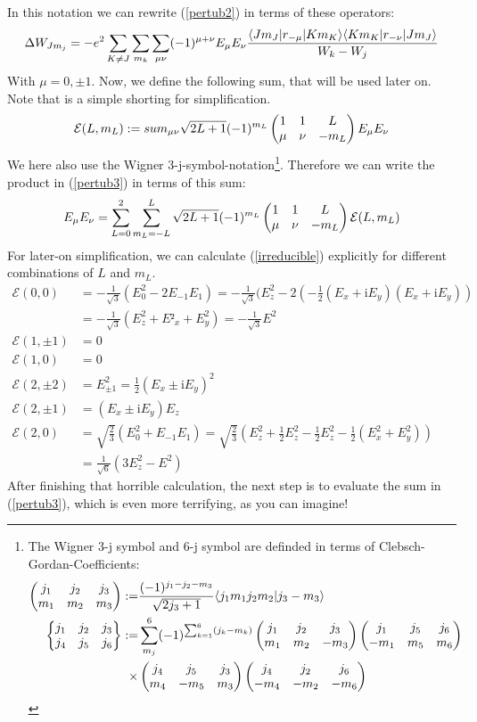 In this notation we can rewrite (\ref{pertub2}) in terms of these operators:
\begin{equation}
\Delta W_{Jm_j}=-e^2\sum_{K\neq J}\sum_{m_k}\sum_{\mu\nu}(-1)^{\mu+\nu}E_\mu E_\nu\frac{\langle Jm_J| r_{-\mu} | Km_K\rangle\langle Km_K| r_{-\nu} | Jm_J\rangle}{W_k-W_j}\label{pertub3}
\end{equation}
With $\mu=0,\pm1$. Now, we define the following sum, that will be used later on. Note that is a simple shorting for simplification.
\begin{equation}
\mathcal{E}(L,m_L):=\\sum_{\mu\nu}\sqrt{2L+1}(-1)^{m_L}\begin{pmatrix}1&1&L\\\mu&\nu&-m_L\end{pmatrix}E_\mu E_\nu\label{irreducible}
\end{equation}
We here also use the Wigner 3-j-symbol-notation\footnote{The Wigner 3-j symbol and 6-j symbol are definded in terms of Clebsch-Gordan-Coefficients:\begin{align}\begin{pmatrix}j_1&j_2&j_3\\m_1&m_2&m_3\end{pmatrix}:=&\frac{(-1)^{j_1-j_2-m_3}}{\sqrt{2j_3+1}}\langle j_1m_1j_2m_2 | j_3-m_3 \rangle\\\begin{Bmatrix}j_1&j_2&j_3\\j_4&j_5&j_6\end{Bmatrix}:=&\sum^6_{m_j}(-1)^{\sum^6_{k=1}(j_k-m_k)}\begin{pmatrix}j_1&j_2&j_3\\m_1&m_2&-m_3\end{pmatrix}\begin{pmatrix}j_1&j_5&j_6\\-m_1&m_5&m_6\end{pmatrix}\\\times&\begin{pmatrix}j_4&j_5&j_3\\m_4&-m_5&m_3\end{pmatrix}\begin{pmatrix}j_4&j_2&j_6\\-m_4&-m_2&-m_6\end{pmatrix}\label{jsymbols}\end{align}}. Therefore we can write the product in (\ref{pertub3}) in terms of this sum: 
\begin{equation}
E_\mu E_\nu=\sum^2_{L=0}\sum^L_{m_L=-L}\sqrt{2L+1}(-1)^{m_L}\begin{pmatrix}1&1&L\\\mu&\nu&-m_L\end{pmatrix}\mathcal{E}(L,m_L)
\end{equation}
For later-on simplification, we can calculate (\ref{irreducible}) explicitly for different combinations of $L$ and $m_L$.
\begin{align*}
\mathcal{E}(0,0)&=-\frac{1}{\sqrt{3}}(E^2_0-2E_{-1}E_{1})=-\frac{1}{\sqrt{3}}(E^2_z-2(-\frac{1}{2}(E_x+\mathrm{i}E_y)(E_x+\mathrm{i}E_y))\\&=-\frac{1}{\sqrt{3}}(E^2_z+E²_x+E^2_y)=-\frac{1}{\sqrt{3}}E^2\\
\mathcal{E}(1,\pm 1)&=0\\
\mathcal{E}(1,0)&=0\\
\mathcal{E}(2,\pm2)&=E^2_{\pm1}=\frac{1}{2}(E_x\pm \mathrm{i}E_y)^2\\
\mathcal{E}(2,\pm1)&=(E_x\pm \mathrm{i}E_y)E_z\\
\mathcal{E}(2,0)&=\sqrt{\frac{2}{3}}(E^2_0+E_{-1}E_1)=\sqrt{\frac{2}{3}}(E^2_z+\frac{1}{2}E^2_z-\frac{1}{2}E^2_z-\frac{1}{2}(E^2_x+E^2_y))\\&=\frac{1}{\sqrt{6}}(3E^2_z-E^2)
\end{align*}
After finishing that horrible calculation, the next step is to evaluate the sum in (\ref{pertub3}), which is even more terrifying, as you can imagine!

